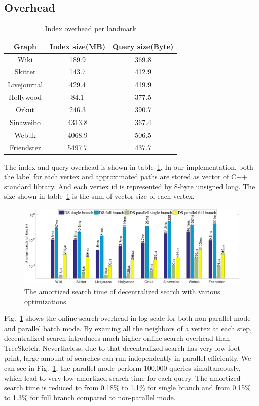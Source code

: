 \subsection{Overhead}
\label{eval_overhead}

\begin{table}
		\caption{Index overhead per landmark}
    \label{table:ioh}
    \centering
    \begin{tabular}{c|cc} \hline
				Graph&Index size(MB)&Query size(Byte)\\ \hline
				Wiki&189.9&369.8 \\ 
				Skitter&143.7&412.9 \\ 
				Livejournal&429.4&419.9 \\ 
				Hollywood&84.1&377.5 \\ 
				Orkut&246.3&390.7 \\ 
				Sinaweibo&4313.8&367.4 \\ 
				Webuk&4068.9&506.5 \\ 
				Friendster&5497.7&437.7 \\ \hline
    \end{tabular}
\end{table}

The index and query overhead is shown in table~\ref{table:ioh}. In our implementation, both the label for each vertex and approximated paths are stored as vector of C++ standard library. And each vertex id is represented by 8-byte unsigned long. The size shown in table~\ref{table:ioh} is the sum of vector size of each vertex. 

\begin{figure}[t]
    \centering
    \includegraphics[width=\linewidth]{./figures/overhead_search.pdf}
    \caption{The amortized search time of decentralized search with various optimizations.}
    \label{fig:overhead_search}
\end{figure}

Fig.~\ref{fig:overhead_search} shows the online search overhead in log scale for both non-parallel mode and parallel batch mode. By examing all the neighbors of a vertex at each step, decentralized search introduces much higher online search overhead than TreeSketch. Nevertheless, due to that decentralized search has very low foot print, large amount of searches can run independently in parallel efficiently. We can see in Fig.~\ref{fig:overhead_search}, the parallel mode perform 100,000 queries simultaneously, which lead to very low amortized search time for each query. The amortized search time is reduced to from 0.18\% to 1.1\% for single branch and from 0.15\% to 1.3\% for full branch compared to non-parallel mode. 

